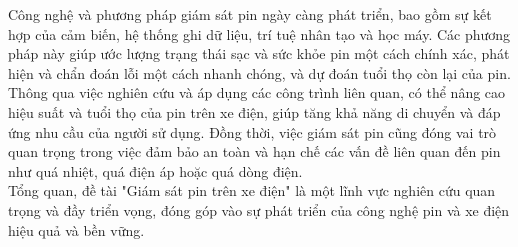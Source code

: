 \documentclass[letterpaper,13pt]{article}
\theoremstyle{mytheor}
\begin{document}
Công nghệ và phương pháp giám sát pin ngày càng phát triển, bao gồm sự kết hợp của cảm biến, hệ thống ghi dữ liệu, trí tuệ nhân tạo và học máy. 
Các phương pháp này giúp ước lượng trạng thái sạc và sức khỏe pin một cách chính xác, phát hiện và chẩn đoán lỗi một cách nhanh chóng, và dự đoán 
tuổi thọ còn lại của pin.\\

Thông qua việc nghiên cứu và áp dụng các công trình liên quan, có thể nâng cao hiệu suất và tuổi thọ của pin trên xe điện, giúp tăng khả năng 
di chuyển và đáp ứng nhu cầu của người sử dụng. Đồng thời, việc giám sát pin cũng đóng vai trò quan trọng trong việc đảm bảo an toàn và hạn chế 
các vấn đề liên quan đến pin như quá nhiệt, quá điện áp hoặc quá dòng điện.\\

Tổng quan, đề tài "Giám sát pin trên xe điện" là một lĩnh vực nghiên cứu quan trọng và đầy triển vọng, đóng góp vào sự phát triển của công nghệ pin 
và xe điện hiệu quả và bền vững.\\
\printbibliography
\end{document}
